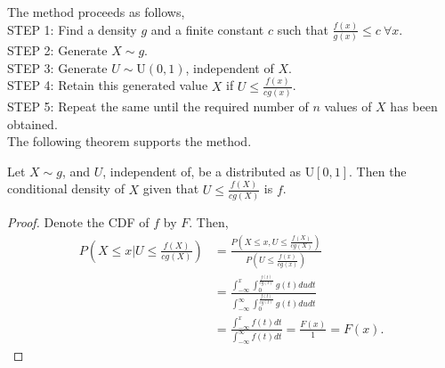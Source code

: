 The method proceeds as follows, \\
STEP 1: Find a density $g$ and a finite constant  $c$ such that  $\frac{f(x)}{g(x)}\le c \ \forall x$.\\
STEP 2: Generate $X\sim g$.\\
STEP 3: Generate  $U\sim \text{U}(0,1)$, independent of  $X$. \\
STEP 4: Retain this generated value  $X$ if  $U\le \frac{f(x)}{cg(x)}$.\\
STEP 5: Repeat the same until the required number of $n$ values of  $X$ has been obtained.\\

The following theorem supports the method.
\begin{theorem}
    Let $X\sim g$, and  $U$, independent of, be a distributed as $ \text{U}[0,1]$. Then the conditional density of $X$ given that
	$U\le \frac{f(X)}{cg(X)}$ is $f$.
\end{theorem}
\begin{proof}
	Denote the CDF of $f$ by $F$. Then,
	\begin{align*}
		P\left( X\le x|U\le \frac{f(X)}{cg(X)} \right) & = \frac{P\left( X\le x, U\le \frac{f(X)}{cg(X)} \right)}{P\left( U\le \frac{f(x)}{cg(x)} \right)}                            \\
		                                               & = \frac{\int_{-\infty}^{x}\int_{0}^{\frac{f(t)}{cg(t)}}g(t)dudt}{\int_{-\infty}^{\infty}\int_0^{\frac{f(t)}{cg(t)}}g(t)dudt} \\
		                                               & = \frac{\int_{-\infty}^{x}f(t)dt}{\int_{-\infty}^{\infty}f(t)dt} = \frac{F(x)}{1}= F(x).
	\end{align*}
\end{proof}

